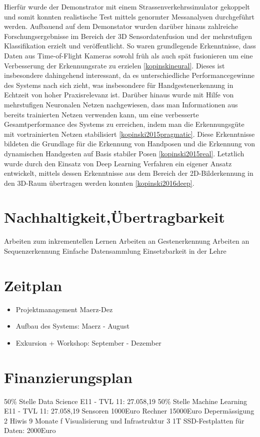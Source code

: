 \documentclass{article}
\begin{document}
Hierfür wurde der Demonstrator mit einem Strassenverkehrssimulator gekoppelt und somit konnten realistische Test mittels genormter Messanalysen durchgeführt werden. Aufbauend auf dem Demonstator wurden darüber hinaus zahlreiche Forschungsergebnisse im Bereich der 3D Sensordatenfusion und der mehrstufigen Klassifikation erzielt und veröffentlicht. So waren grundlegende Erkenntnisse, dass Daten aus Time-of-Flight Kameras sowohl früh als auch spät fusionieren um eine Verbesserung der Erkennungsrate zu erzielen \ref{kopinskineural}. Dieses ist insbesondere dahingehend interessant, da es unterschiedliche Performancegewinne des Systems nach sich zieht, was insbesondere für Handgestenerkennung in Echtzeit von hoher Praxisrelevanz ist. Darüber hinaus wurde mit Hilfe von mehrstufigen Neuronalen Netzen nachgewiesen, dass man Informationen aus bereits trainierten Netzen verwenden kann, um eine verbesserte Gesamtperformance des Systems zu erreichen, indem man die Erkennungsgüte mit vortrainierten Netzen stabilisiert \ref{kopinski2015pragmatic}. Diese Erkenntnisse bildeten die Grundlage für die Erkennung von Handposen und die Erkennung von dynamischen Handgesten auf Basis stabiler Posen \ref{kopinski2015real}. Letztlich wurde durch den Einsatz von Deep Learning Verfahren ein eigener Ansatz entwickelt, mittels dessen Erkenntnisse aus dem Bereich der 2D-Bilderkennung in den 3D-Raum übertragen werden konnten \ref{kopinski2016deep}.  
%
\renewcommand{\thesection}{6}
\section{Nachhaltigkeit,Übertragbarkeit}
Arbeiten zum inkrementellen Lernen
Arbeiten an Gestenerkennung
Arbeiten an Sequenzerkennung
Einfache Datensammlung
Einsetzbarkeit in der Lehre

\renewcommand{\thesection}{7}
\section{Zeitplan}

\begin{itemize}
\item Projektmanagement Maerz-Dez
\item Aufbau des Systems: Maerz - August
\item Exkursion + Workshop: September - Dezember

\end{itemize}

\renewcommand{\thesection}{8}
\section{Finanzierungsplan}
50\% Stelle Data Science E11 - TVL 11: 27.058,19
50\% Stelle Machine Learning E11 - TVL 11: 27.058,19
Sensoren 1000Euro
Rechner 15000Euro
Depermässigung
2 Hiwis 9 Monate f Visualisierung und Infrastruktur
3 1T SSD-Festplatten für Daten: 2000Euro


\renewcommand{\refname}{}


%
\end{document}
